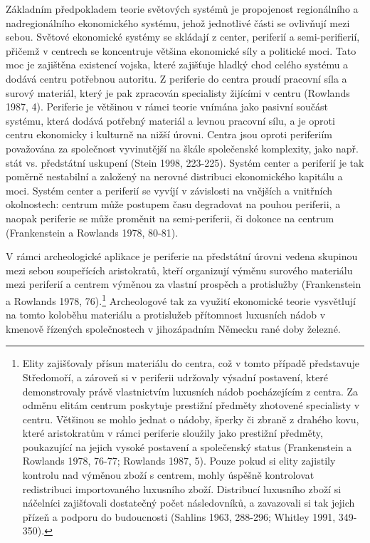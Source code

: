 Základním předpokladem teorie světových systémů je propojenost regionálního a nadregionálního ekonomického systému, jehož jednotlivé části se ovlivňují mezi sebou. Světové ekonomické systémy se skládají z center, periferií a semi-perifierií, přičemž v centrech se koncentruje většina ekonomické síly a politické moci. Tato moc je zajištěna existencí vojska, které zajišťuje hladký chod celého systému a dodává centru potřebnou autoritu. Z periferie do centra proudí pracovní síla a surový materiál, který je pak zpracován specialisty žijícími v centru (Rowlands 1987, 4). Periferie je většinou v rámci teorie vnímána jako pasivní součást systému, která dodává potřebný materiál a levnou pracovní sílu, a je oproti centru ekonomicky i kulturně na nižší úrovni. Centra jsou oproti periferiím považována za společnost vyvinutější na škále společenské komplexity, jako např. stát vs. předstátní uskupení (Stein 1998, 223-225). Systém center a periferií je tak poměrně nestabilní a založený na nerovné distribuci ekonomického kapitálu a moci. Systém center a periferií se vyvíjí v závislosti na vnějších a vnitřních okolnostech: centrum může postupem času degradovat na pouhou periferii, a naopak periferie se může proměnit na semi-periferii, či dokonce na centrum (Frankenstein a Rowlands 1978, 80-81).

V rámci archeologické aplikace je periferie na předstátní úrovni vedena skupinou mezi sebou soupeřících aristokratů, kteří organizují výměnu surového materiálu mezi periferií a centrem výměnou za vlastní prospěch a protislužby (Frankenstein a Rowlands 1978, 76).\footnote{Elity zajišťovaly přísun materiálu do centra, což v tomto případě představuje Středomoří, a zároveň si v periferii udržovaly výsadní postavení, které demonstrovaly právě vlastnictvím luxusních nádob pocházejícím z centra. Za odměnu elitám centrum poskytuje prestižní předměty zhotovené specialisty v centru. Většinou se mohlo jednat o nádoby, šperky či zbraně z drahého kovu, které aristokratům v rámci periferie sloužily jako prestižní předměty, poukazující na jejich vysoké postavení a společenský status (Frankenstein a Rowlands 1978, 76-77; Rowlands 1987, 5). Pouze pokud si elity zajistily kontrolu nad výměnou zboží s centrem, mohly úspěšně kontrolovat redistribuci importovaného luxusního zboží. Distribucí luxusního zboží si náčelníci zajišťovali dostatečný počet následovníků, a zavazovali si tak jejich přízeň a podporu do budoucnosti (Sahlins 1963, 288-296; Whitley 1991, 349-350).} Archeologové tak za využití ekonomické teorie vysvětlují na tomto koloběhu materiálu a protislužeb přítomnost luxusních nádob v kmenově řízených společnostech v jihozápadním Německu rané doby železné.

